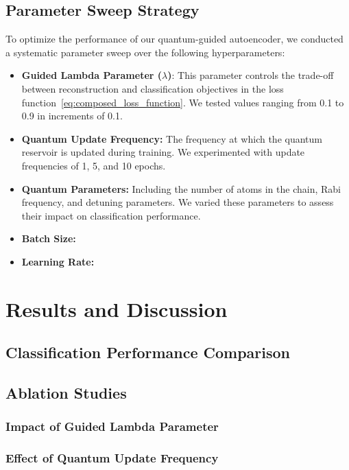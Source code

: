 \documentclass[conference]{IEEEtran}
\begin{document}
\subsection{Parameter Sweep Strategy}
To optimize the performance of our quantum-guided autoencoder, 
we conducted a systematic parameter sweep over the following hyperparameters:
\begin{itemize}
    \item \textbf{Guided Lambda Parameter (\( \lambda \))}: 
    This parameter controls the trade-off between reconstruction and classification objectives in the loss function~\ref{eq:composed_loss_function}. We tested values ranging from 0.1 to 0.9 in increments of 0.1.

    \item \textbf{Quantum Update Frequency:} 
    The frequency at which the quantum reservoir is updated during training. We experimented with update frequencies of 1, 5, and 10 epochs.

    \item \textbf{Quantum Parameters:} 
    Including the number of atoms in the chain, Rabi frequency, and detuning parameters. We varied these parameters to assess their impact on classification performance.
    \item \textbf{Batch Size:}
    \item \textbf{Learning Rate:}
\end{itemize}

\section{Results and Discussion}
\subsection{Classification Performance Comparison}
\subsection{Ablation Studies}
\subsubsection{Impact of Guided Lambda Parameter}
\subsubsection{Effect of Quantum Update Frequency}
\end{document}
